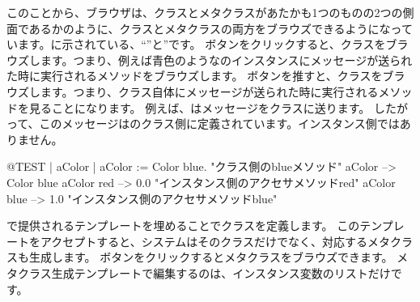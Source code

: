 \documentclass[a4paper,10pt,twoside]{book}
\begin{document}
このことから、ブラウザは、クラスとメタクラスがあたかも1つのものの2つの側面であるかのように、クラスとメタクラスの両方をブラウズできるようになっています。に示されている、``''と''です。
ボタンをクリックすると、クラスをブラウズします。つまり、例えば青色のようなのインスタンスにメッセージが送られた時に実行されるメソッドをブラウズします。
ボタンを推すと、クラスをブラウズします。つまり、クラス自体にメッセージが送られた時に実行されるメソッドを見ることになります。
例えば、はメッセージをクラスに送ります。
したがって、このメッセージはのクラス側に定義されています。インスタンス側ではありません。

\begin{code}{@TEST | aColor |}
aColor := Color blue.               "クラス側のblueメソッド"
aColor        --> Color blue
aColor red  --> 0.0         "インスタンス側のアクセサメソッドred"
aColor blue --> 1.0        "インスタンス側のアクセサメソッドblue"
\end{code}

で提供されるテンプレートを埋めることでクラスを定義します。
このテンプレートをアクセプトすると、システムはそのクラスだけでなく、対応するメタクラスも生成します。
ボタンをクリックするとメタクラスをブラウズできます。
メタクラス生成テンプレートで編集するのは、インスタンス変数のリストだけです。
\end{document}
